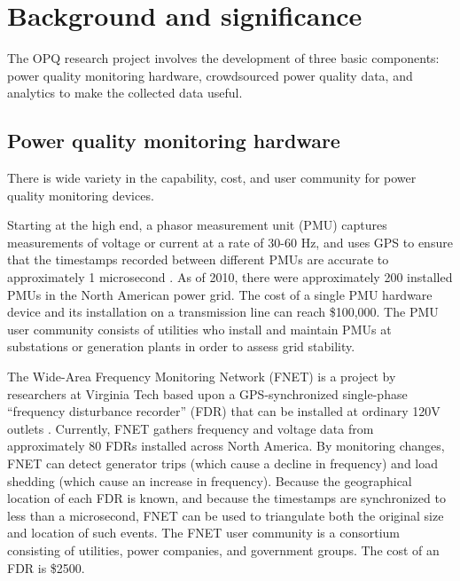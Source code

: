 
\section{Background and significance}


The OPQ research project involves the development of three basic components: power quality monitoring hardware, crowdsourced power quality data, and analytics to make the collected data useful. 

\subsection{Power quality monitoring hardware}
\label{sec:background-hardware}

There is wide variety in the capability, cost, and user community for power quality monitoring devices.

Starting at the high end, a phasor measurement unit (PMU) captures measurements of voltage or current at a rate of 30-60 Hz, and uses GPS to ensure that the timestamps recorded between different PMUs are accurate to approximately 1 microsecond \cite{Zhang2007}. As of 2010, there were approximately 200 installed PMUs in the North American power grid. The cost of a single PMU hardware device and its installation on a transmission line can reach \$100,000. The PMU user community consists of utilities who install and maintain PMUs at substations or generation plants in order to assess grid stability.

The Wide-Area Frequency Monitoring Network (FNET) is a project by researchers at Virginia Tech based upon a GPS-synchronized single-phase ``frequency disturbance recorder'' (FDR) that can be installed at ordinary 120V outlets \cite{Zhang2010}. Currently, FNET gathers frequency and voltage data from approximately 80 FDRs installed across North America.  By monitoring changes, FNET can detect generator trips (which cause a decline in frequency) and load shedding (which cause an increase in frequency). Because the geographical location of each FDR is known, and because the timestamps are synchronized to less than a microsecond, FNET can be used to triangulate both the original size and location of such events. The FNET user community is a consortium consisting of utilities, power companies, and government groups.  The cost of an FDR is \$2500.

